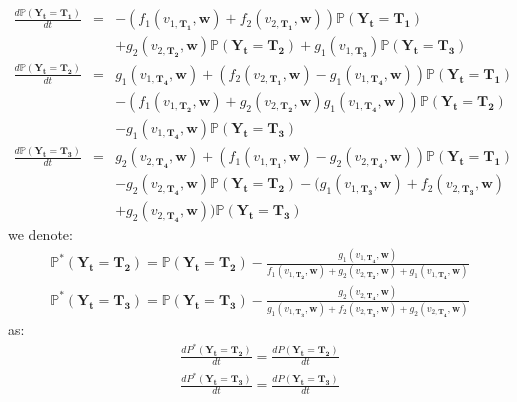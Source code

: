 \begin{eqnarray}
\nonumber \frac{d\mathbb{P}(\mathbf{Y_t}=\mathbf{T_1})}{dt} &=& -(f_1(v_{1,\mathbf{T_1}},\mathbf{w}) + f_2(v_{2,\mathbf{T_1}},\mathbf{w})) \mathbb{P}(\mathbf{Y_t}=\mathbf{T_1})
\\  & & + g_2(v_{2,\mathbf{T_2}},\mathbf{w}) \mathbb{P}(\mathbf{Y_t}=\mathbf{T_2}) + g_1(v_{1,\mathbf{T_3}})\mathbb{P}(\mathbf{Y_t}=\mathbf{T_3}) \\
\nonumber \frac{d\mathbb{P}(\mathbf{Y_t}=\mathbf{T_2})}{dt} &=& g_1(v_{1,\mathbf{T_4}}, \mathbf{w})+(f_2(v_{2,\mathbf{T_1}}, \mathbf{w}) - g_1(v_{1,\mathbf{T_4}}, \mathbf{w}))\mathbb{P}(\mathbf{Y_t}=\mathbf{T_1}) \\
\nonumber  & & - (f_1(v_{1,\mathbf{T_2}}, \mathbf{w})+g_2(v_{2,\mathbf{T_2}}, \mathbf{w})
g_1(v_{1,\mathbf{T_4}}, \mathbf{w}))\mathbb{P}(\mathbf{Y_t}=\mathbf{T_2}) \\
 & & - g_1(v_{1,\mathbf{T_4}}, \mathbf{w})\mathbb{P}(\mathbf{Y_t}=\mathbf{T_3}) \\
\nonumber \frac{d\mathbb{P}(\mathbf{Y_t}=\mathbf{T_3})}{dt} &=& g_2(v_{2,\mathbf{T_4}}, \mathbf{w})+(f_1(v_{1,\mathbf{T_1}}, \mathbf{w})-g_2(v_{2,\mathbf{T_4}}, \mathbf{w}))\mathbb{P}(\mathbf{Y_t}=\mathbf{T_1}) \\
\nonumber & & - g_2(v_{2,\mathbf{T_4}}, \mathbf{w})\mathbb{P}(\mathbf{Y_t}=\mathbf{T_2})
-(g_1(v_{1,\mathbf{T_3}}, \mathbf{w})+f_2(v_{2,\mathbf{T_3}}, \mathbf{w}) \\
 & & + g_2(v_{2,\mathbf{T_4}}, \mathbf{w}))\mathbb{P}(\mathbf{Y_t}=\mathbf{T_3})
\end{eqnarray}
we denote:
\begin{eqnarray}
\label{eqAnn2_5.8} \mathbb{P}^*(\mathbf{Y_t}=\mathbf{T_2})=\mathbb{P}(\mathbf{Y_t}=\mathbf{T_2})-\frac{g_1(v_{1,\mathbf{T_4}}, \mathbf{w})}{f_1(v_{1,\mathbf{T_2}}, \mathbf{w})+g_2(v_{2,\mathbf{T_2}}, \mathbf{w})+g_1(v_{1,\mathbf{T_4}}, \mathbf{w})} \\
\label{eqAnn2_5.9} \mathbb{P}^*(\mathbf{Y_t}=\mathbf{T_3})=\mathbb{P}(\mathbf{Y_t}=\mathbf{T_3})-\frac{g_2(v_{2,\mathbf{T_4}}, \mathbf{w})}{g_1(v_{1,\mathbf{T_3}}, \mathbf{w})+f_2(v_{2,\mathbf{T_3}}, \mathbf{w})+g_2(v_{2,\mathbf{T_4}}, \mathbf{w})}
\end{eqnarray}
as:
\begin{eqnarray}
\frac{dP^*(\mathbf{Y_t}=\mathbf{T_2})}{dt}=\frac{dP(\mathbf{Y_t}=\mathbf{T_2})}{dt} \\
\frac{dP^*(\mathbf{Y_t}=\mathbf{T_3})}{dt}=\frac{dP(\mathbf{Y_t}=\mathbf{T_3})}{dt}
\end{eqnarray}
